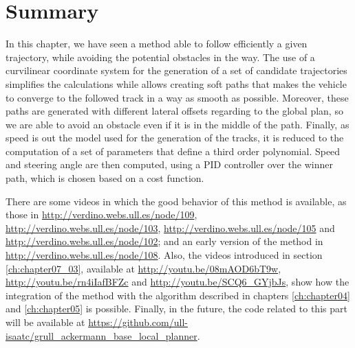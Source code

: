 % 

\section{Summary}\label{ch:chapter07_04}

In this chapter, we have seen a method able to follow efficiently a given trajectory, while avoiding the potential obstacles in the way. The use of a curvilinear coordinate system for the generation of a set of candidate trajectories simplifies the calculations while allows creating soft paths that makes the vehicle to converge to the followed track in a way as smooth as possible. Moreover, these paths are generated with different lateral offsets regarding to the global plan, so we are able to avoid an obstacle even if it is in the middle of the path. Finally, as speed is out the model used for the generation of the tracks, it is reduced to the computation of a set of parameters that define a third order polynomial. Speed and steering angle are then computed, using a \ac{PID} controller over the winner path, which is chosen based on a cost function.

There are some videos in which the good behavior of this method is available, as those in \url{http://verdino.webs.ull.es/node/109}, \url{http://verdino.webs.ull.es/node/103}, \url{http://verdino.webs.ull.es/node/105} and \url{http://verdino.webs.ull.es/node/102}; and an early version of the method in \url{http://verdino.webs.ull.es/node/108}. Also, the videos introduced in section \ref{ch:chapter07_03}, available at \url{http://youtu.be/08mAOD6bT9w}, \url{http://youtu.be/rn4iIafBFZc} and \url{http://youtu.be/SCQ6_GYjbJs}, show how the integration of the method with the algorithm described in chapters \ref{ch:chapter04} and \ref{ch:chapter05} is possible. Finally, in the future, the code related to this part will be available at \url{https://github.com/ull-isaatc/grull_ackermann_base_local_planner}. 

